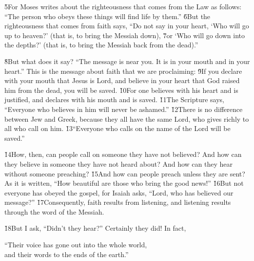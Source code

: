 \v{5}For Moses writes about the righteousness that comes from the Law as follows: ``The person who obeys these things will find life by them.'' \v{6}But the righteousness that comes from faith says, ``Do not say in your heart, `Who will go up to heaven?' (that is, to bring the Messiah down), \v{7}or `Who will go down into the depths?' (that is, to bring the Messiah back from the dead).''

\v{8}But what does it say? ``The message is near you. It is in your mouth and in your heart.'' This is the message about faith that we are proclaiming: \v{9}If you declare with your mouth that Jesus is Lord, and believe in your heart that God raised him from the dead, you will be saved. \v{10}For one believes with his heart and is justified, and declares with his mouth and is saved. \v{11}The Scripture says, ``Everyone who believes in him will never be ashamed.'' \v{12}There is no difference between Jew and Greek, because they all have the same Lord, who gives richly to all who call on him. \v{13}``Everyone who calls on the name of the Lord will be saved.''

\v{14}How, then, can people call on someone they have not believed? And how can they believe in someone they have not heard about? And how can they hear without someone preaching? \v{15}And how can people preach unless they are sent? As it is written, ``How beautiful are those who bring the good news!'' \v{16}But not everyone has obeyed the gospel, for Isaiah asks, ``Lord, who has believed our message?'' \v{17}Consequently, faith results from listening, and listening results through the word of the Messiah.

\v{18}But I ask, ``Didn't they hear?'' Certainly they did! In fact,

\begin{poetry}
\poeml ``Their voice has gone out into the whole world, \\
\poemll    and their words to the ends of the earth.''
\end{poetry}

